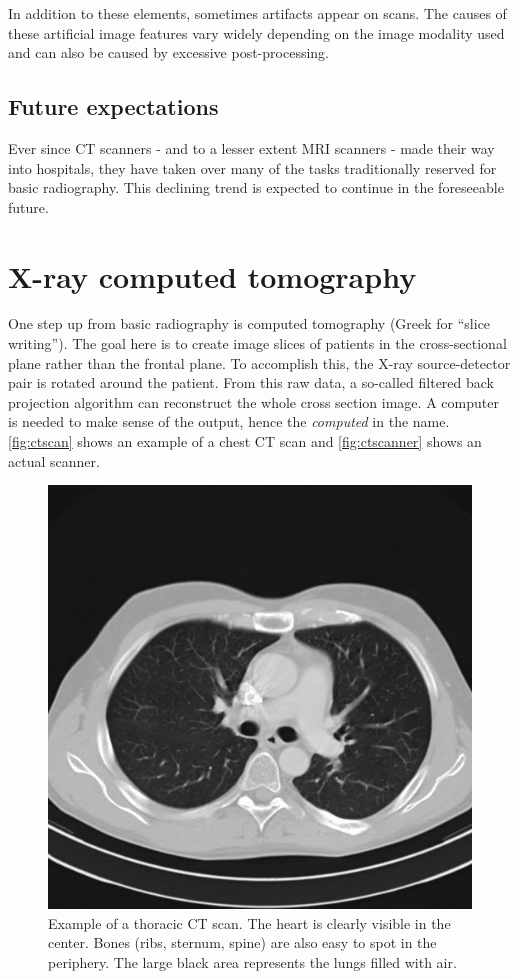 In addition to these elements, sometimes artifacts appear on scans. The
causes of these artificial image features vary widely depending on the image
modality used and can also be caused by excessive post-processing.

\subsection{Future expectations}
Ever since CT scanners - and to a lesser extent MRI scanners - made their way
into hospitals, they have taken over many of the tasks traditionally reserved
for basic radiography. This declining trend is expected to continue in the
foreseeable future.

\section{X-ray computed tomography}
One step up from basic radiography is computed tomography (Greek for ``slice
writing''). The goal here is to create image slices of patients in the
cross-sectional plane rather than the frontal plane. To accomplish this, the X-ray
source-detector pair is rotated around the patient. From this raw data, a
so-called filtered back projection algorithm can reconstruct the whole cross
section image. A computer is needed to make sense of the output, hence the
\emph{computed} in the name. \autoref{fig:ctscan} shows an example of a chest
CT scan and \autoref{fig:ctscanner} shows an actual scanner.

\begin{figure}[ht]
\begin{center}
  \includegraphics[width=0.4\linewidth]{img/ct-thorax.jpg}
  \caption{Example of a thoracic CT scan. The heart is clearly visible in the
  center. Bones (ribs, sternum, spine) are also easy to spot in the periphery.
  The large black area represents the lungs filled with air.}
  \label{fig:ctscan}
\end{center}
\end{figure}

